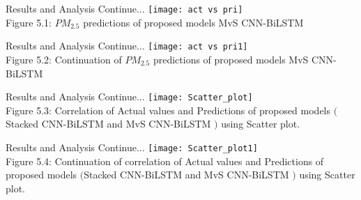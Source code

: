 \documentclass[12pt, aspectratio=169]{beamer}
\begin{document}

\begin{frame}{Results and Analysis \tiny{Continue...}}
	\centering
	\texttt{[image: act vs pri]}\\
	\scriptsize{Figure 5.1: $PM_{2.5}$ predictions of proposed models MvS CNN-BiLSTM}
\end{frame}



\begin{frame}{Results and Analysis \tiny{Continue...}}
	\centering
	\texttt{[image: act vs pri1]}\\
	\scriptsize{Figure 5.2: Continuation of $PM_{2.5}$ predictions of proposed models MvS CNN-BiLSTM}
\end{frame}


\begin{frame}{Results and Analysis \tiny{Continue...}}
	\centering
	\texttt{[image: Scatter\_plot]}\\
	\scriptsize{Figure 5.3: Correlation of Actual values and Predictions of proposed models $($Stacked CNN-BiLSTM and MvS CNN-BiLSTM $)$ using Scatter plot.}
\end{frame}
\begin{frame}{Results and Analysis \tiny{Continue...}}
	\centering
	\texttt{[image: Scatter\_plot1]}\\
	\scriptsize{Figure 5.4: Continuation of correlation of Actual values and Predictions of proposed models $($Stacked CNN-BiLSTM and MvS CNN-BiLSTM $)$ using Scatter plot.}
\end{frame}
\end{document}
